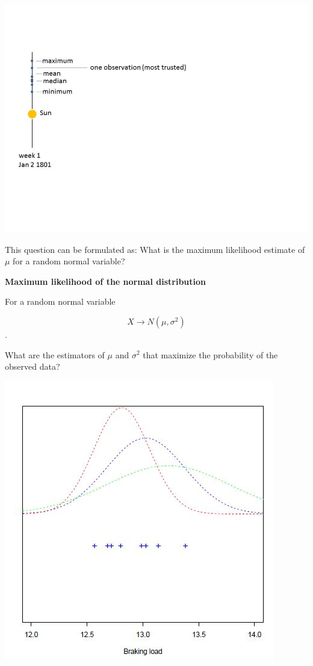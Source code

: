 \documentclass[
]{book}
\begin{document}
\includegraphics{./figures/cerestime.JPG}

This question can be formulated as: What is the maximum likelihood estimate of \(\mu\) for a random normal variable?

\textbf{Maximum likelihood of the normal distribution}

For a random normal variable

\[X \rightarrow N(\mu, \sigma^2)\].

What are the estimators of \(\mu\) and \(\sigma^2\) that maximize the probability of the observed data?

\includegraphics{./figures/normpar.JPG}
\end{document}
